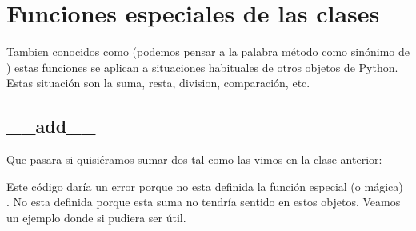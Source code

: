 \documentclass[a5paper,9pt,spanish]{sphinxmanual}
\begin{document}
\sphinxstepscope


\chapter{Funciones especiales de las clases}
\label{\detokenize{class-extras:funciones-especiales-de-las-clases}}\label{\detokenize{class-extras::doc}}
\sphinxAtStartPar
Tambien conocidos como  (podemos pensar a la palabra método como
sinónimo de ) estas funciones se aplican a situaciones habituales de otros
objetos de Python. Estas situación son la suma, resta, division, comparación, etc.


\section{\_\_add\_\_}
\label{\detokenize{class-extras:add}}
\sphinxAtStartPar
Que pasara si quisiéramos sumar dos  tal como las vimos en la clase anterior:

\begin{sphinxVerbatim}[commandchars=\\\{\}]
   
   

    
\end{sphinxVerbatim}

\sphinxAtStartPar
Este código daría un error porque no esta definida la función especial (o mágica) .
No esta definida porque esta suma no tendría sentido en estos objetos.
Veamos un ejemplo donde si pudiera ser útil.
\end{document}
